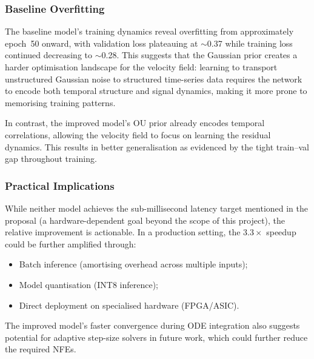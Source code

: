 \documentclass[11pt,a4paper]{article}
\begin{document}
\subsubsection{Baseline Overfitting}

The baseline model's training dynamics reveal overfitting from approximately
epoch~50 onward, with validation loss plateauing at $\sim$0.37 while training
loss continued decreasing to $\sim$0.28.
This suggests that the Gaussian prior creates a harder optimisation landscape
for the velocity field: learning to transport unstructured Gaussian noise to
structured time-series data requires the network to encode both temporal
structure and signal dynamics, making it more prone to memorising training
patterns.

In contrast, the improved model's OU prior already encodes temporal
correlations, allowing the velocity field to focus on learning the residual
dynamics.
This results in better generalisation as evidenced by the tight train--val
gap throughout training.

\subsubsection{Practical Implications}

While neither model achieves the sub-millisecond latency target mentioned in
the proposal (a hardware-dependent goal beyond the scope of this project), the
relative improvement is actionable.
In a production setting, the $3.3\times$ speedup could be further amplified
through:

\begin{itemize}[nosep]
    \item Batch inference (amortising overhead across multiple inputs);
    \item Model quantisation (INT8 inference);
    \item Direct deployment on specialised hardware (FPGA/ASIC).
\end{itemize}

The improved model's faster convergence during ODE integration also suggests
potential for adaptive step-size solvers in future work, which could further
reduce the required NFEs.
\end{document}
